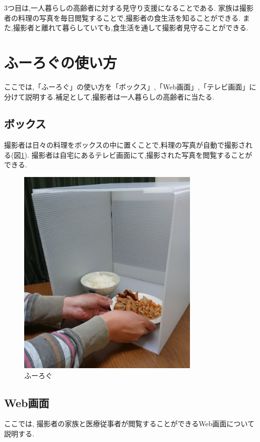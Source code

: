 \documentclass[../report]{subfiles}
\begin{document}
3つ目は,一人暮らしの高齢者に対する見守り支援になることである.
家族は撮影者の料理の写真を毎日閲覧することで,撮影者の食生活を知ることができる.
また,撮影者と離れて暮らしていても,食生活を通して撮影者見守ることができる.

\section{ふーろぐの使い方}
ここでは,「ふーろぐ」の使い方を「ボックス」,「Web画面」,「テレビ画面」に分けて説明する.補足として,撮影者は一人暮らしの高齢者に当たる.

\subsection{ボックス}
撮影者は日々の料理をボックスの中に置くことで,料理の写真が自動で撮影される(図\ref{fig:fl}).
撮影者は自宅にあるテレビ画面にて,撮影された写真を閲覧することができる.
\begin{figure}[htbp]
    \begin{center}
        \includegraphics[height=10cm]{imgs/fl.png}
        \caption{ふーろぐ}
        \label{fig:fl}
    \end{center}
\end{figure}

\subsection{Web画面}
ここでは, 撮影者の家族と医療従事者が閲覧することができるWeb画面について説明する.
\end{document}
